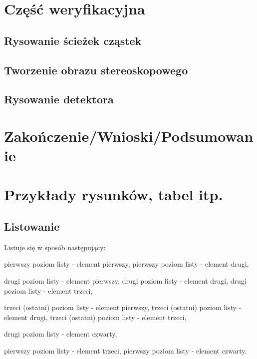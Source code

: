 \newpage
\section{Część weryfikacyjna}
\subsection{Rysowanie ścieżek cząstek}





\subsection{Tworzenie obrazu stereoskopowego}
\subsection{Rysowanie detektora}


\section[Zakończenie]{Zakończenie/Wnioski/Podsumowanie}


\newpage
\section[Przykłady]{Przykłady rysunków, tabel itp.}
\subsection{Listowanie}
Listuje się w sposób następujący:
\begin{itemize}
	\itemi pierwszy poziom listy - element pierwszy,
	\itemi pierwszy poziom listy - element drugi,
	\begin{itemize}
		\itemii drugi poziom listy - element pierwszy,
		\itemii drugi poziom listy - element drugi,
		\itemii drugi poziom listy - element trzeci,
		\begin{itemize}
			\itemiii trzeci (ostatni) poziom listy - element pierwszy,
			\itemiii trzeci (ostatni) poziom listy - element drugi,
			\itemiii trzeci (ostatni) poziom listy - element trzeci,
		\end{itemize}
		\itemii drugi poziom listy - element czwarty,
		\end{itemize}
	\itemi pierwszy poziom listy - element trzeci,
	\itemi pierwszy poziom listy - element czwarty.
\end{itemize}

